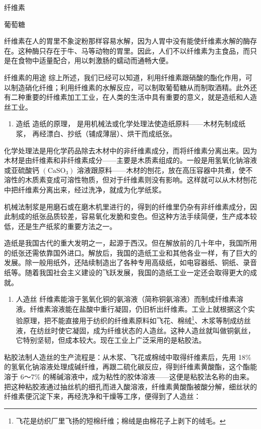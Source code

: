 纤维素

葡萄糖

纤维素在人的胃里不象淀粉那样容易水解，因为人胃中没有能使纤维素水解的酶存在。这种酶只存在于牛、马等动物的胃里。因此，人们不以纤维素为主食品，而只是在食物中适量配合，用以刺激肠的蠕动而通畅大便。

纤维素的用途
综上所述，我们已经可以知道，利用纤维素跟硝酸的酯化作用，可以制造硝化纤维；利用纤维素的水解反应，可以制取葡萄糖从而制取酒精。此外还有二种重要的纤维素加工工业，在人类的生活中具有重要的意义，就是造纸和人造丝工业。

\begin{enumerate}
\item
  造纸 造纸的原理，
  是用机械法或化学处理法使造纸原料------木材先制成纸浆，
  再经漂白、抄纸（铺成薄层）、烘干而成纸张。
\end{enumerate}

化学处理法是用化学药品除去木材中的非纤维素成分，而将纤维素分离出来。因为木材是由纤维素和非纤维素成分------主要是木质素组成的。一般是用氢氧化钠溶液或亚硫酸钙
\(\left(\mathrm{CaSO}_{3}\right)\)
溶液跟原料------木材的刨花，放在高压容器中共煮，使不溶性的木质素变成可溶性物质，但对于纤维素则没有影响。这样就可以从木材刨花中把纤维素分离出来，经过洗净，就成为化学纸浆。

机械法制浆是用磨石或在磨木机里进行的，得到的纤维里仍杂有非纤维素成分，因此制成的纸张品质较差，容易氧化发脆和变色。但这种方法手续简便，生产成本较低，还是生产纸浆的重要方法之一。

造纸是我国古代的重大发明之一，起源于西汉。但在解放前的几十年中，我国所用的纸张还需依靠国外进口。解放后，我国的造纸工业和其他各业一样，有了巨大的发展。除一般用纸外，还陆续制造出了各种专用高级纸，如电容器纸、铜纸、录音纸等。随着我国社会主义建设的飞跃发展，我国的造纸工业一定还会取得更大的成就。

\begin{enumerate}[start=2]
\item
  人造丝
  纤维素能溶于氢氧化铜的氨溶液（简称铜氨溶液）而制成纤维素溶液。纤维素溶液能在盐酸中重行凝固，仍旧析出纤维素。工业上就根据这个实验原理，把不能直接用于纺织的纤维素原料如飞花、棉绒\footnote{飞花是纺织厂里飞扬的短棉纤维；棉绒是由棉花子上剥下的绒毛。}、木浆等制成纺丝液，在纺丝时使它凝固，成为纤维状态的人造丝。这种人造丝就叫做铜氨丝，它特别坚韧，但成本较大。现在工业上广泛采用的是粘胶法。
\end{enumerate}

粘胶法制人造丝的生产流程是：从木浆、飞花或棉绒中取得纤维素后，先用 18\%
的氢氧化钠溶液处理成碱纤维，再跟二硫化碳反应，得到纤维素黄酸酯，这个酯能溶于
6～7\%
的稀碱溶液中，成为粘性的胶体溶液------这便是粘胶法名称的由来。把这种粘胶液通过抽丝机的细孔而进入酸溶液，纤维素黄酸酯被酸分解，细丝状的纤维素便沉淀下来，再经洗净和干燥等工序，便得到了人造丝：

